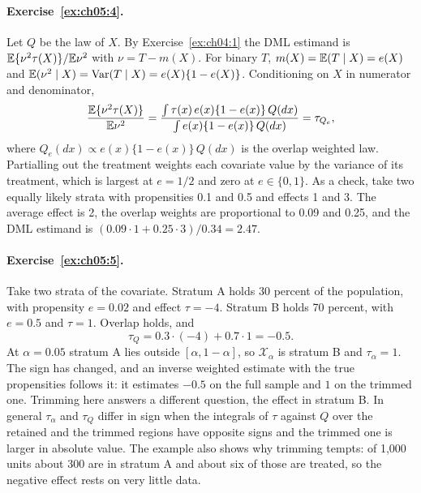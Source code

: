 \paragraph{Exercise~\ref{ex:ch05:4}.} Let $Q$ be the law of $X$. By Exercise~\ref{ex:ch04:1} the DML estimand is $\mathbb{E}\{\nu^2\tau(X)\}/\mathbb{E}\nu^2$ with $\nu = T - m(X)$. For binary $T$, $m(X) = \mathbb{E}(T \mid X) = e(X)$ and $\mathbb{E}(\nu^2 \mid X) = \mathrm{Var}(T \mid X) = e(X)\{1 - e(X)\}$. Conditioning on $X$ in numerator and denominator,
\[
\frac{\mathbb{E}\{\nu^2\tau(X)\}}{\mathbb{E}\nu^2} = \frac{\int \tau(x)\,e(x)\{1 - e(x)\}\,Q(dx)}{\int e(x)\{1 - e(x)\}\,Q(dx)} = \tau_{Q_e},
\]
where $Q_e(dx) \propto e(x)\{1 - e(x)\}\,Q(dx)$ is the overlap weighted law. Partialling out the treatment weights each covariate value by the variance of its treatment, which is largest at $e = 1/2$ and zero at $e \in \{0, 1\}$. As a check, take two equally likely strata with propensities 0.1 and 0.5 and effects 1 and 3. The average effect is 2, the overlap weights are proportional to 0.09 and 0.25, and the DML estimand is $(0.09 \cdot 1 + 0.25 \cdot 3)/0.34 = 2.47$.

\paragraph{Exercise~\ref{ex:ch05:5}.} Take two strata of the covariate. Stratum A holds 30 percent of the population, with propensity $e = 0.02$ and effect $\tau = -4$. Stratum B holds 70 percent, with $e = 0.5$ and $\tau = 1$. Overlap holds, and
\[
\tau_Q = 0.3 \cdot (-4) + 0.7 \cdot 1 = -0.5.
\]
At $\alpha = 0.05$ stratum A lies outside $[\alpha, 1 - \alpha]$, so $\mathcal{X}_\alpha$ is stratum B and $\tau_\alpha = 1$. The sign has changed, and an inverse weighted estimate with the true propensities follows it: it estimates $-0.5$ on the full sample and $1$ on the trimmed one. Trimming here answers a different question, the effect in stratum B. In general $\tau_\alpha$ and $\tau_Q$ differ in sign when the integrals of $\tau$ against $Q$ over the retained and the trimmed regions have opposite signs and the trimmed one is larger in absolute value. The example also shows why trimming tempts: of 1,000 units about 300 are in stratum A and about six of those are treated, so the negative effect rests on very little data.

